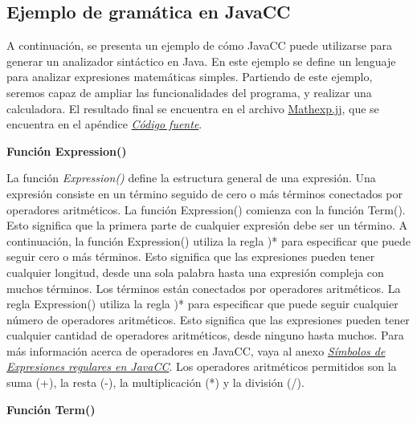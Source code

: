\subsection{Ejemplo de gramática en JavaCC}
\noindent A continuación, se presenta un ejemplo de cómo JavaCC puede utilizarse para generar un analizador sintáctico en Java. En este ejemplo se define un lenguaje para analizar expresiones matemáticas simples. Partiendo de este ejemplo, seremos capaz de ampliar las funcionalidades del programa, y realizar una calculadora. El resultado final se encuentra en el archivo \hyperref[sec:mathexp]{Mathexp.jj}, que se encuentra en el apéndice \hyperref[sec:codigofuente]{\textit{Código fuente}}.

\phantom{text}

\noindent \textbf{Función Expression()}

\phantom{text}

\lstset{inputencoding=utf8/latin1}


\noindent La función \textit{Expression()} define la estructura general de una expresión. Una expresión consiste en un término seguido de cero o más términos conectados por operadores aritméticos. La función Expression() comienza con la función Term(). Esto significa que la primera parte de cualquier expresión debe ser un término. A continuación, la función Expression() utiliza la regla )* para especificar que puede seguir cero o más términos. Esto significa que las expresiones pueden tener cualquier longitud, desde una sola palabra hasta una expresión compleja con muchos términos.
Los términos están conectados por operadores aritméticos. La regla Expression() utiliza la regla )* para especificar que puede seguir cualquier número de operadores aritméticos. Esto significa que las expresiones pueden tener cualquier cantidad de operadores aritméticos, desde ninguno hasta muchos. Para más información acerca de operadores en JavaCC, vaya al anexo \hyperref[sec:simbolosdeexpresionesregulares]{\textit{Símbolos de Expresiones regulares en JavaCC}}.
Los operadores aritméticos permitidos son la suma (+), la resta (-), la multiplicación (*) y la división (/).

\phantom{text}

\noindent \textbf{Función Term()}

\phantom{text}

\lstset{inputencoding=utf8/latin1}


